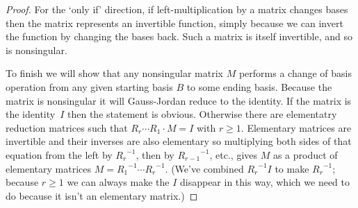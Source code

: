 \begin{proof}
For the `only if' direction, 
if left-multiplication by a matrix changes bases then
the matrix represents an invertible function,
simply because we can invert the function by changing the bases back.
Such a matrix is itself invertible, and so is nonsingular.

To finish we will show that any nonsingular matrix $M$ 
performs a change of basis operation from any given starting basis $B$ 
to some ending basis.
Because the matrix is nonsingular it will Gauss-Jordan reduce to the
identity.
If the matrix is the identity~$I$ then the statement is obvious.
Otherwise there are elementatry reduction matrices such that
$R_r\cdots R_1\cdot M=I$ with $r\geq 1$.
Elementary matrices are invertible and their inverses are also elementary
so multiplying both sides of that equation from the left 
by ${R_r}^{-1}$, then by ${R_{r-1}}^{-1}$, etc., gives 
$M$ as a product of elementary matrices
$M={R_1}^{-1}\cdots {R_r}^{-1}$.
(We've combined ${R_r}^{-1}I$ to make ${R_r}^{-1}$; 
because $r\geq 1$ we can always make the $I$ disappear in this way,
which we need to do because it isn't an elementary matrix.)


\end{proof}
